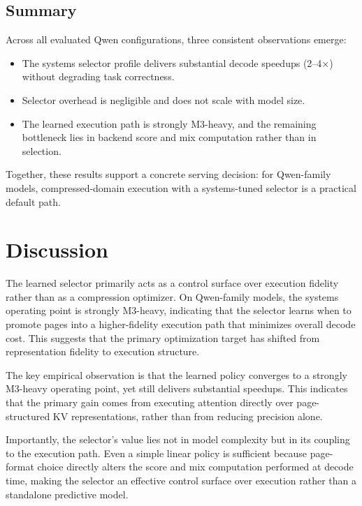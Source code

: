 \documentclass[11pt]{article}
\begin{document}
\subsection{Summary}

Across all evaluated Qwen configurations, three consistent observations emerge:
\begin{itemize}[leftmargin=1.5em]
\item The systems selector profile delivers substantial decode speedups (2--4$\times$) without degrading task correctness.
\item Selector overhead is negligible and does not scale with model size.
\item The learned execution path is strongly M3-heavy, and the remaining bottleneck lies in backend score and mix computation rather than in selection.
\end{itemize}

Together, these results support a concrete serving decision: for Qwen-family models, compressed-domain execution with a systems-tuned selector is a practical default path.

\FloatBarrier

\section{Discussion}

The learned selector primarily acts as a control surface over execution fidelity rather than as a compression optimizer. On Qwen-family models, the systems operating point is strongly M3-heavy, indicating that the selector learns when to promote pages into a higher-fidelity execution path that minimizes overall decode cost. This suggests that the primary optimization target has shifted from representation fidelity to execution structure.

The key empirical observation is that the learned policy converges to a strongly M3-heavy operating point, yet still delivers substantial speedups. This indicates that the primary gain comes from executing attention directly over page-structured KV representations, rather than from reducing precision alone.

Importantly, the selector’s value lies not in model complexity but in its coupling to the execution path. Even a simple linear policy is sufficient because page-format choice directly alters the score and mix computation performed at decode time, making the selector an effective control surface over execution rather than a standalone predictive model.
\end{document}
